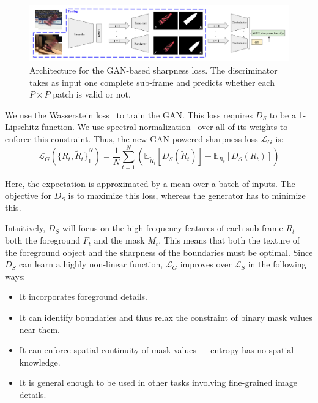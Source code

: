     \begin{figure}
        \centering
        \includegraphics[width=\textwidth]{images/gan-arch.png}
        \caption{
            Architecture for the GAN-based sharpness loss.
            The discriminator takes as input one complete sub-frame and predicts whether each $P \times P$ patch is valid or not.
        }%
        \label{fig:gan-arch}
    \end{figure}

    We use the Wasserstein loss~\citep{wgan} to train the GAN.\@
    This loss requires $D_S$ to be a 1-Lipschitz function.
    We use spectral normalization~\citep{spectral-norm} over all of its weights to enforce this constraint.
    Thus, the new GAN-powered sharpness loss $\mathcal{L}_G$ is:
    \begin{equation}
        \mathcal{L}_G({\{ R_t, \tilde{R}_t \}}_1^N) = \frac{1}{N} \sum_{t=1}^N \left( \mathbb{E}_{\tilde{R}_t}[D_S(\tilde{R}_t)] - \mathbb{E}_{R_t}[D_S(R_t)] \right)
    \end{equation}

    Here, the expectation is approximated by a mean over a batch of inputs.
    The objective for $D_S$ is to maximize this loss, whereas the generator has to minimize this.

    Intuitively, $D_S$ will focus on the high-frequency features of each sub-frame $R_t$ --- both the foreground $F_t$ and the mask $M_t$.
    This means that both the texture of the foreground object and the sharpness of the boundaries must be optimal.
    Since $D_S$ can learn a highly non-linear function, $\mathcal{L}_G$ improves over $\mathcal{L}_S$ in the following ways:
    \begin{itemize}
        \item It incorporates foreground details.
        \item It can identify boundaries and thus relax the constraint of binary mask values near them.
        \item It can enforce spatial continuity of mask values --- entropy has no spatial knowledge.
        \item It is general enough to be used in other tasks involving fine-grained image details.
    \end{itemize}

